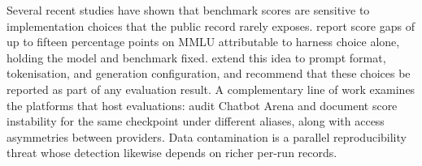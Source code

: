 \documentclass[11pt]{article}
\begin{document}
%


Several recent studies have shown that benchmark scores are sensitive to
implementation choices that the public record rarely exposes.
\citet{alzahrani2024} report score gaps of up to fifteen percentage points on
MMLU attributable to harness choice alone, holding the model and benchmark
fixed. \citet{biderman2024} extend this idea to prompt format, tokenisation,
and generation configuration, and recommend that these choices be reported as
part of any evaluation result. A complementary line of work examines the
platforms that host evaluations: \citet{singh2025} audit Chatbot Arena and
document score instability for the same checkpoint under different aliases,
along with access asymmetries between providers. Data contamination
\citep{sainz2023} is a parallel reproducibility threat whose detection likewise depends on richer per-run records.
\end{document}
